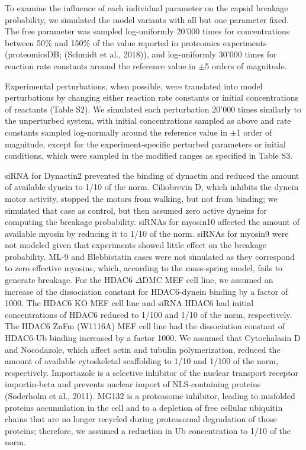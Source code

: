 To examine the influence of each individual parameter on the capsid breakage probability, we simulated the model variants with all but one parameter fixed. The free parameter was sampled log-uniformly 20’000 times for concentrations between 50\% and 150\% of the value reported in proteomics experiments (proteomicsDB; (Schmidt et al., 2018)), and log-uniformly 30’000 times for reaction rate constants around the reference value in $\pm$5 orders of magnitude.

Experimental perturbations, when possible, were translated into model perturbations by changing either reaction rate constants or initial concentrations of reactants (Table S2). We simulated each perturbation 20’000 times similarly to the unperturbed system, with initial concentrations sampled as above and rate constants sampled log-normally around the reference value in $\pm$1 order of magnitude, except for the experiment-specific perturbed parameters or initial conditions, which were sampled in the modified ranges as specified in Table S3.

siRNA for Dynactin2 prevented the binding of dynactin and reduced the amount of available dynein to 1/10 of the norm. Ciliobrevin D, which inhibits the dynein motor activity, stopped the motors from walking, but not from binding; we simulated that case as control, but then assumed zero active dyneins for computing the breakage probability. siRNAs for myosin10 affected the amount of available myosin by reducing it to 1/10 of the norm. siRNAs for myosin9 were not modeled given that experiments showed little effect on the breakage probability. ML-9 and Blebbistatin cases were not simulated as they correspond to zero effective myosins, which, according to the mass-spring model, fails to generate breakage. For the HDAC6 $\Delta$DMC MEF cell line, we assumed an increase of the dissociation constant for HDAC6-dynein binding by a factor of 1000. The HDAC6 KO MEF cell line and siRNA HDAC6 had initial concentrations of HDAC6 reduced to 1/100 and 1/10 of the norm, respectively. The HDAC6 ZnFm (W1116A) MEF cell line had the dissociation constant of HDAC6-Ub binding increased by a factor 1000. We assumed that Cytochalasin D and Nocodazole, which affect actin and tubulin polymerization, reduced the amount of available cytoskeletal scaffolding to 1/10 and 1/100 of the norm, respectively. Importazole is a selective inhibitor of the nuclear transport receptor importin-beta and prevents nuclear import of NLS-containing proteins (Soderholm et al., 2011). MG132 is a proteasome inhibitor, leading to misfolded proteins accumulation in the cell and to a depletion of free cellular ubiquitin chains that are no longer recycled during proteasomal degradation of those proteins; therefore, we assumed a reduction in Ub concentration to 1/10 of the norm.

